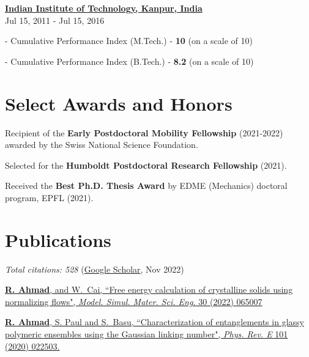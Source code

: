 \documentclass[margin,line]{resume}
\begin{document}
\begin{resume}
    \textbf{\href{http://www.iitk.ac.in/}{\textsf{Indian Institute of Technology, Kanpur, India}}}\vspace{0mm}\\
     \hfill \small{Jul 15, 2011 - Jul 15, 2016}
    \vspace{-3mm}
    \begin{compactitem}
        \item[-] {Cumulative Performance Index (M.Tech.) - \textbf{10} (on a scale of 10)}
        \item[-] {Cumulative Performance Index (B.Tech.) - \textbf{8.2} (on a scale of 10)}
    \end{compactitem}%

    \section{\mysidestyle Select Awards and Honors}  \vspace{0mm}

    Recipient of the \textbf{Early Postdoctoral Mobility Fellowship} (2021-2022) awarded by the Swiss National Science Foundation.

    \vspace{-0.3cm}
    Selected for the \textbf{Humboldt Postdoctoral Research Fellowship} (2021).

    \vspace{-0.3cm}
    Received the \textbf{Best Ph.D. Thesis Award} by EDME (Mechanics) doctoral program, EPFL (2021).

    \section{\mysidestyle Publications}
    \small{\textit{Total citations: 528} (\href{https://scholar.google.ch/citations?user=ujjgd08AAAAJ&hl=en}{Google Scholar}, Nov 2022)}

    \href{https://iopscience.iop.org/article/10.1088/1361-651X/ac7f4b} {\textbf{R. Ahmad}, and W.~Cai, ``Free energy calculation of crystalline solids using normalizing flows", \textit{Model. Simul. Mater. Sci. Eng.} 30 (2022) 065007}

    \href{https://journals.aps.org/pre/abstract/10.1103/PhysRevE.101.022503} {\textbf{R. Ahmad}, S. Paul and S.~Basu, ``Characterization of entanglements in glassy polymeric ensembles using the Gaussian linking number", \textit{Phys. Rev. E} 101 (2020) 022503.}


\end{resume}
\end{document}
